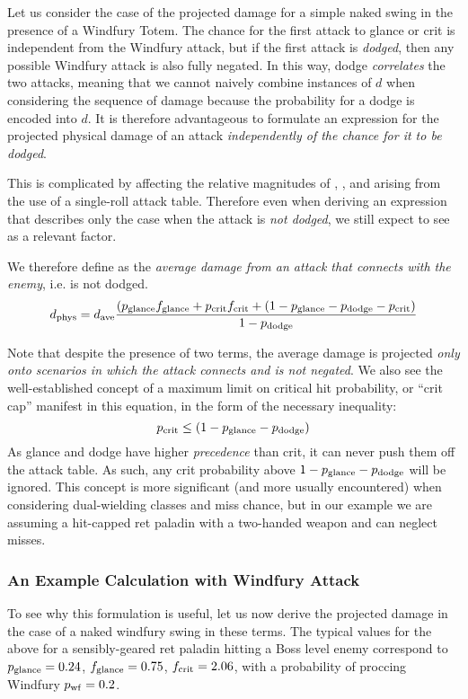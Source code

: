 Let us consider the case of the projected damage for a simple naked swing in the presence of a Windfury Totem.
The chance for the first attack to glance or crit is independent from the Windfury attack, but if the first attack is \emph{dodged}, then any possible Windfury attack is also fully negated.
In this way, dodge \emph{correlates} the two attacks, meaning that we cannot naively combine instances of $d$ when considering the sequence of damage because the probability for a dodge is encoded into $d$.
It is therefore advantageous to formulate an expression for the projected physical damage of an attack \emph{independently of the chance for it to be dodged}.

This is complicated by \pdodge affecting the relative magnitudes of \phit, \pglance, and \pcrit arising from the use of a single-roll attack table.
Therefore even when deriving an expression that describes only the case when the attack is \emph{not dodged}, we still expect to see \pdodge as a relevant factor.

We therefore define \dphys as the \emph{average damage from an attack that connects with the enemy}, i.e. is not dodged.
\begin{equation}
	d_{\mathrm{phys}}  = d_{\mathrm{ave}}  \frac{(p_{\mathrm{glance}}  f_{\mathrm{glance}}  + p_{\mathrm{crit}}  f_{\mathrm{crit}}  + (1 - p_{\mathrm{glance}}  - p_{\mathrm{dodge}}  - p_{\mathrm{crit}} )}{1 - p_{\mathrm{dodge}} }
\end{equation}

Note that despite the presence of two \pdodge terms, the average damage is projected \emph{only onto scenarios in which the attack connects and is not negated}.
We also see the well-established concept of a maximum limit on critical hit probability, or ``crit cap'' manifest in this equation, in the form of the necessary inequality:
\begin{equation}
	p_{\mathrm{crit}}  \leq (1-p_{\mathrm{glance}}  - p_{\mathrm{dodge}} )
\end{equation}
As glance and dodge have higher \emph{precedence} than crit, it can never push them off the attack table.
As such, any crit probability above $1 - p_{\mathrm{glance}}  - p_{\mathrm{dodge}} $ will be ignored.
This concept is more significant (and more usually encountered) when considering dual-wielding classes and miss chance, but in our example we are assuming a hit-capped ret paladin with a two-handed weapon and can neglect misses.

\subsubsection{An Example Calculation with Windfury Attack}
To see why this formulation is useful, let us now derive the projected damage in the case of a naked windfury swing in these terms.
The typical values for the above for a sensibly-geared ret paladin hitting a Boss level enemy correspond to $p_{\mathrm{glance}}  = 0.24$, $f_{\mathrm{glance}}  = 0.75$, $f_{\mathrm{crit}}  = 2.06$, with a probability of proccing Windfury $p_{\mathrm{wf}}  = 0.2$.

